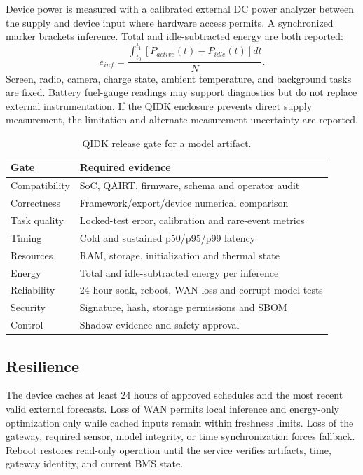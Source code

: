 Device power is measured with a calibrated external DC power analyzer between the supply and device input where hardware access permits. A synchronized marker brackets inference. Total and idle-subtracted energy are both reported:
\begin{equation}
	e_{inf}=\frac{\int_{t_0}^{t_1}[P_{active}(t)-P_{idle}(t)]dt}{N}.
\end{equation}
Screen, radio, camera, charge state, ambient temperature, and background tasks are fixed. Battery fuel-gauge readings may support diagnostics but do not replace external instrumentation. If the QIDK enclosure prevents direct supply measurement, the limitation and alternate measurement uncertainty are reported.

\begin{table}[t]
	\centering
	\caption{QIDK release gate for a model artifact.}
	\label{tab:qidk-gate}
	\begin{tabularx}{\columnwidth}{p{}X}
		\toprule
		Gate          & Required evidence                                      \\
		\midrule
		Compatibility & SoC, QAIRT, firmware, schema and operator audit        \\
		Correctness   & Framework/export/device numerical comparison           \\
		Task quality  & Locked-test error, calibration and rare-event metrics  \\
		Timing        & Cold and sustained p50/p95/p99 latency                 \\
		Resources     & RAM, storage, initialization and thermal state         \\
		Energy        & Total and idle-subtracted energy per inference         \\
		Reliability   & 24-hour soak, reboot, WAN loss and corrupt-model tests \\
		Security      & Signature, hash, storage permissions and SBOM          \\
		Control       & Shadow evidence and safety approval                    \\
		\bottomrule
	\end{tabularx}
\end{table}

\subsection{Resilience}

The device caches at least 24 hours of approved schedules and the most recent valid external forecasts. Loss of WAN permits local inference and energy-only optimization only while cached inputs remain within freshness limits. Loss of the gateway, required sensor, model integrity, or time synchronization forces fallback. Reboot restores read-only operation until the service verifies artifacts, time, gateway identity, and current BMS state.
